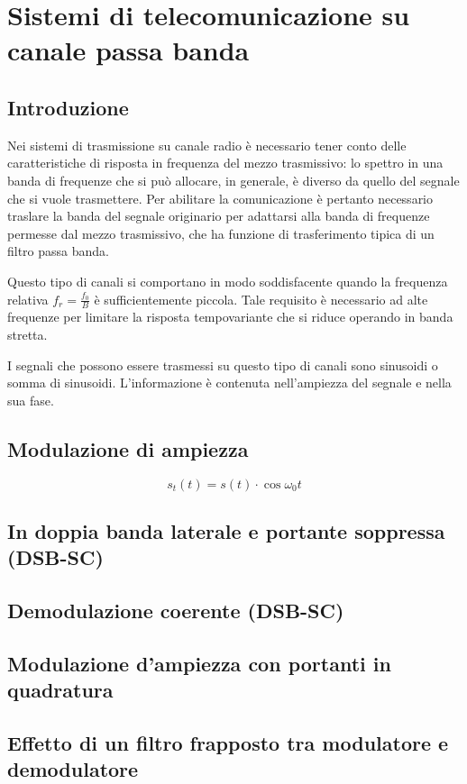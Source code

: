 \chapter{Sistemi di telecomunicazione su canale passa banda}\label{cap:sis_telcom_band_pass}
\section{Introduzione}
Nei sistemi di trasmissione su canale radio è necessario tener conto delle caratteristiche di risposta in frequenza del mezzo trasmissivo: lo spettro in una banda di frequenze che si può allocare, in generale, è diverso da quello del segnale che si vuole trasmettere. Per abilitare la comunicazione è pertanto necessario traslare la banda del segnale originario per adattarsi alla banda di frequenze permesse dal mezzo trasmissivo, che ha funzione di trasferimento tipica di un filtro passa banda.

Questo tipo di canali si comportano in modo soddisfacente quando la frequenza relativa $f_r=\frac{f_0}{B}$ è sufficientemente piccola. Tale requisito è necessario ad alte frequenze per limitare la risposta tempovariante che si riduce operando in banda stretta.

I segnali che possono essere trasmessi su questo tipo di canali sono sinusoidi o somma di sinusoidi. L'informazione è contenuta nell'ampiezza del segnale e nella sua fase.

\clearpage
\section{Modulazione di ampiezza}
\[s_t(t)=s(t)\cdot\cos{\omega_0 t}\]
\section{In doppia banda laterale e portante soppressa (DSB-SC)}
\section{Demodulazione coerente (DSB-SC)}
\section{Modulazione d'ampiezza con portanti in quadratura}
\section{Effetto di un filtro frapposto tra modulatore e demodulatore}
